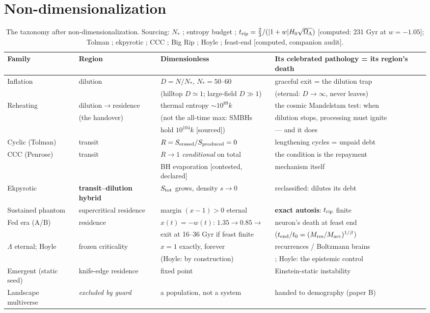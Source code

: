\documentclass[11pt]{article}
\begin{document}
\section{Non-dimensionalization}
\begin{table}[h]\centering\small
\begin{tabular}{llll}
\toprule
Family & Region & Dimensionless & Its celebrated pathology = its region's death\\
\midrule
Inflation & dilution & $D = N/N_*$, $N_* = 50$--$60$ & graceful exit = the dilution trap\\
 & & (hilltop $D \simeq 1$; large-field $D \gg 1$) & (eternal: $D \to \infty$, never leaves)\\
Reheating & dilution$\to$residence & thermal entropy $\sim 10^{89}k$ & the cosmic Mandelstam test: when\\
 & (the handover) & (not the all-time max: SMBHs & dilution stops, processing must ignite\\
 & & hold $10^{104}k$ [sourced]) & --- and it does\\
Cyclic (Tolman) & transit & $R = S_{\rm erased}/S_{\rm produced} = 0$ & lengthening cycles = unpaid debt\\
CCC (Penrose) & transit & $R \to 1$ \emph{conditional} on total & the condition is the repayment\\
 & & BH evaporation [contested, declared] & mechanism itself\\
Ekpyrotic & \textbf{transit--dilution hybrid} & $S_{\rm tot}$ grows, density $s \to 0$ & reclassified: dilutes its debt\\
Sustained phantom & supercritical residence & margin $(x - 1) > 0$ eternal & \textbf{exact autosis}: $t_{\rm rip}$ finite\\
Fed era (A/B) & residence & $x(t) = -w(t)$: $1.35 \to 0.85 \to$ & neuron's death at feast end\\
 & & exit at 16--36 Gyr if feast finite & ($t_{\rm end}/t_0 = (M_{\rm res}/M_{\rm acc})^{1/\beta}$)\\
$\Lambda$ eternal; Hoyle & frozen criticality & $x = 1$ exactly, forever & recurrences / Boltzmann brains\\
 & & (Hoyle: by construction) & \cite{DKS}; Hoyle: the epistemic control\\
Emergent (static seed) & knife-edge residence & fixed point & Einstein-static instability\\
Landscape multiverse & \emph{excluded by guard} & a population, not a system & handed to demography (paper B)\\
\bottomrule
\end{tabular}
\caption{\small The taxonomy after non-dimensionalization. Sourcing: $N_*$ \cite{Efolds,CALT};
entropy budget \cite{EL2010}; $t_{\rm rip} = \tfrac{2}{3}/(|1+w|H_0\sqrt{\Omega_\Lambda})$
[computed: 231 Gyr at $w=-1.05$]; Tolman \cite{Tolman}; ekpyrotic \cite{Ekpy}; CCC \cite{CCC};
Big Rip \cite{Rip}; Hoyle \cite{Hoyle}; feast-end [computed, companion audit].}
\end{table}
\end{document}
